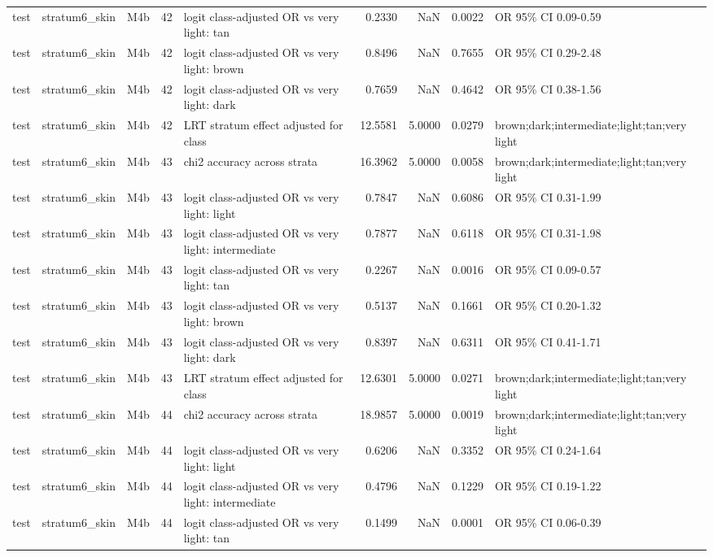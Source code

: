 \begin{tabular}{lllrlrrrl}
test & stratum6\_skin & M4b & 42 & logit class-adjusted OR vs very light: tan & 0.2330 & NaN & 0.0022 & OR 95\% CI 0.09-0.59 \\
test & stratum6\_skin & M4b & 42 & logit class-adjusted OR vs very light: brown & 0.8496 & NaN & 0.7655 & OR 95\% CI 0.29-2.48 \\
test & stratum6\_skin & M4b & 42 & logit class-adjusted OR vs very light: dark & 0.7659 & NaN & 0.4642 & OR 95\% CI 0.38-1.56 \\
test & stratum6\_skin & M4b & 42 & LRT stratum effect adjusted for class & 12.5581 & 5.0000 & 0.0279 & brown;dark;intermediate;light;tan;very light \\
test & stratum6\_skin & M4b & 43 & chi2 accuracy across strata & 16.3962 & 5.0000 & 0.0058 & brown;dark;intermediate;light;tan;very light \\
test & stratum6\_skin & M4b & 43 & logit class-adjusted OR vs very light: light & 0.7847 & NaN & 0.6086 & OR 95\% CI 0.31-1.99 \\
test & stratum6\_skin & M4b & 43 & logit class-adjusted OR vs very light: intermediate & 0.7877 & NaN & 0.6118 & OR 95\% CI 0.31-1.98 \\
test & stratum6\_skin & M4b & 43 & logit class-adjusted OR vs very light: tan & 0.2267 & NaN & 0.0016 & OR 95\% CI 0.09-0.57 \\
test & stratum6\_skin & M4b & 43 & logit class-adjusted OR vs very light: brown & 0.5137 & NaN & 0.1661 & OR 95\% CI 0.20-1.32 \\
test & stratum6\_skin & M4b & 43 & logit class-adjusted OR vs very light: dark & 0.8397 & NaN & 0.6311 & OR 95\% CI 0.41-1.71 \\
test & stratum6\_skin & M4b & 43 & LRT stratum effect adjusted for class & 12.6301 & 5.0000 & 0.0271 & brown;dark;intermediate;light;tan;very light \\
test & stratum6\_skin & M4b & 44 & chi2 accuracy across strata & 18.9857 & 5.0000 & 0.0019 & brown;dark;intermediate;light;tan;very light \\
test & stratum6\_skin & M4b & 44 & logit class-adjusted OR vs very light: light & 0.6206 & NaN & 0.3352 & OR 95\% CI 0.24-1.64 \\
test & stratum6\_skin & M4b & 44 & logit class-adjusted OR vs very light: intermediate & 0.4796 & NaN & 0.1229 & OR 95\% CI 0.19-1.22 \\
test & stratum6\_skin & M4b & 44 & logit class-adjusted OR vs very light: tan & 0.1499 & NaN & 0.0001 & OR 95\% CI 0.06-0.39 \\

\end{tabular}
